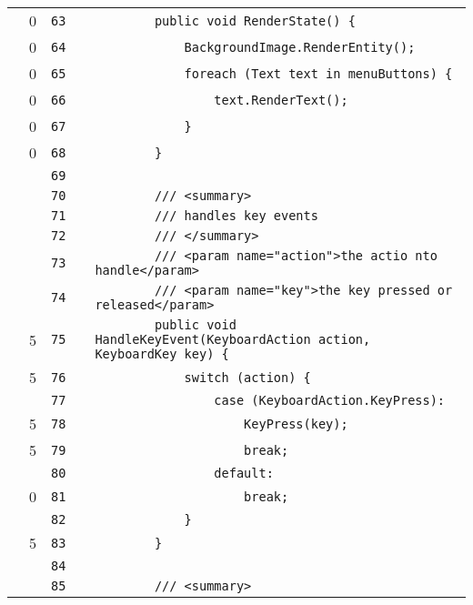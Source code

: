 \documentclass[a4paper,landscape,10pt]{article}
\begin{document}
\begin{longtable}[l]{lrrll}
\cellcolor{red} & 0 & \verb~63~ & & \verb~        public void RenderState() {~\\
\cellcolor{red} & 0 & \verb~64~ & & \verb~            BackgroundImage.RenderEntity();~\\
\cellcolor{red} & 0 & \verb~65~ & & \verb~            foreach (Text text in menuButtons) {~\\
\cellcolor{red} & 0 & \verb~66~ & & \verb~                text.RenderText();~\\
\cellcolor{red} & 0 & \verb~67~ & & \verb~            }~\\
\cellcolor{red} & 0 & \verb~68~ & & \verb~        }~\\
\cellcolor{gray} &  & \verb~69~ & & \verb~~\\
\cellcolor{gray} &  & \verb~70~ & & \verb~        /// <summary>~\\
\cellcolor{gray} &  & \verb~71~ & & \verb~        /// handles key events~\\
\cellcolor{gray} &  & \verb~72~ & & \verb~        /// </summary>~\\
\cellcolor{gray} &  & \verb~73~ & & \verb~        /// <param name="action">the actio nto handle</param>~\\
\cellcolor{gray} &  & \verb~74~ & & \verb~        /// <param name="key">the key pressed or released</param>~\\
\cellcolor{green} & 5 & \verb~75~ & & \verb~        public void HandleKeyEvent(KeyboardAction action, KeyboardKey key) {~\\
\cellcolor{green} & 5 & \verb~76~ & & \verb~            switch (action) {~\\
\cellcolor{gray} &  & \verb~77~ & & \verb~                case (KeyboardAction.KeyPress):~\\
\cellcolor{green} & 5 & \verb~78~ & & \verb~                    KeyPress(key);~\\
\cellcolor{green} & 5 & \verb~79~ & & \verb~                    break;~\\
\cellcolor{gray} &  & \verb~80~ & & \verb~                default:~\\
\cellcolor{red} & 0 & \verb~81~ & & \verb~                    break;~\\
\cellcolor{gray} &  & \verb~82~ & & \verb~            }~\\
\cellcolor{green} & 5 & \verb~83~ & & \verb~        }~\\
\cellcolor{gray} &  & \verb~84~ & & \verb~~\\
\cellcolor{gray} &  & \verb~85~ & & \verb~        /// <summary>~\\

\end{longtable}
\end{document}
